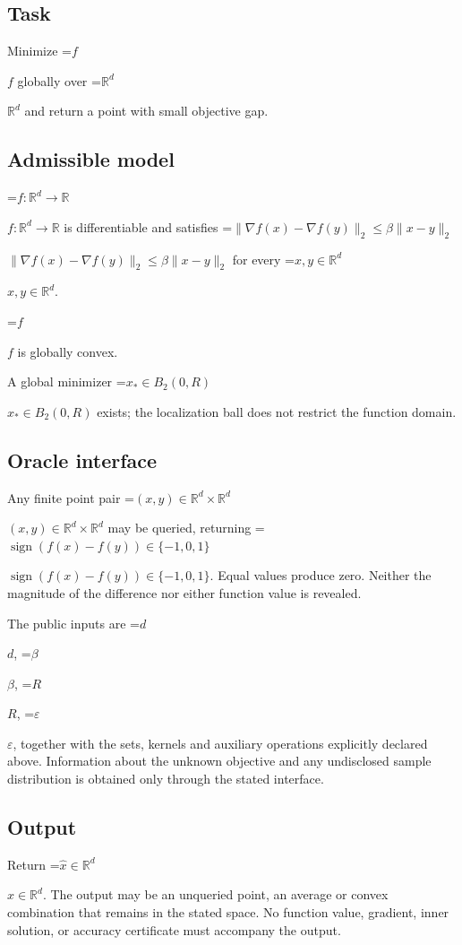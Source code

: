 \documentclass[10pt,a4paper]{article}
\newcommand{\AtlasMath}[1]{\par\begingroup\centering\setbox0=\hbox{$\displaystyle #1$}\ifdim\wd0>1.4\linewidth\typeout{ATLAS WIDE FORMULA: \the\wd0}\fi\ifdim\wd0>\linewidth\resizebox{\linewidth}{!}{\box0}\else\box0\fi\par\endgroup}
\newcommand{\AtlasInlineMath}[1]{\begingroup\setbox0=\hbox{$#1$}\ifdim\wd0>.4\linewidth\endgroup\AtlasMath{#1}\else\endgroup$#1$\fi}
\begin{document}
\subsection{Task}


Minimize \AtlasInlineMath{f} globally over \AtlasInlineMath{\mathbb{R}^d} and return a point with small objective gap.



\subsection{Admissible model}


\AtlasInlineMath{f:\mathbb{R}^d\to\mathbb{R}} is differentiable and satisfies \AtlasInlineMath{\|\nabla f(x)-\nabla f(y)\|_2\le\beta\|x-y\|_2} for every \AtlasInlineMath{x,y\in\mathbb{R}^d}.



\AtlasInlineMath{f} is globally convex.



A global minimizer \AtlasInlineMath{x_*\in B_2(0,R)} exists; the localization ball does not restrict the function domain.



\subsection{Oracle interface}


Any finite point pair \AtlasInlineMath{(x,y)\in\mathbb{R}^d\times\mathbb{R}^d} may be queried, returning \AtlasInlineMath{\operatorname{sign}(f(x)-f(y))\in\{-1,0,1\}}. Equal values produce zero. Neither the magnitude of the difference nor either function value is revealed.



The public inputs are \AtlasInlineMath{d}, \AtlasInlineMath{\beta}, \AtlasInlineMath{R}, \AtlasInlineMath{\varepsilon}, together with the sets, kernels and auxiliary operations explicitly declared above. Information about the unknown objective and any undisclosed sample distribution is obtained only through the stated interface.



\subsection{Output}


Return \AtlasInlineMath{\widehat{x}\in \mathbb{R}^d}. The output may be an unqueried point, an average or convex combination that remains in the stated space. No function value, gradient, inner solution, or accuracy certificate must accompany the output.
\end{document}

